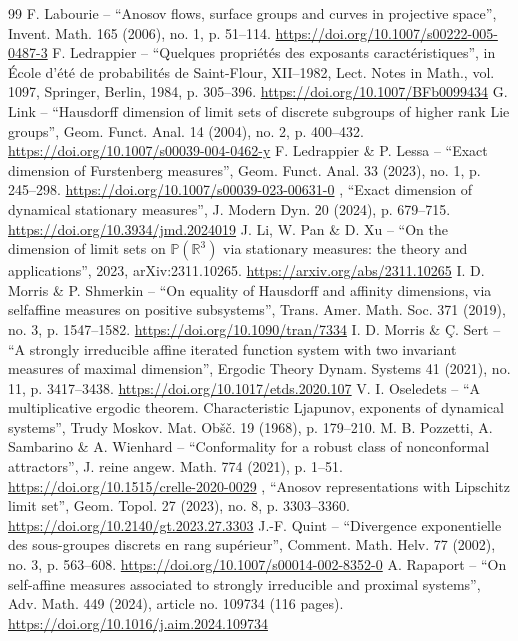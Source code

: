 \begin{thebibliography}{99}
 F. Labourie – “Anosov flows, surface groups and curves in projective space”, Invent. Math. 165 (2006), no. 1, p. 51–114. \url{https://doi.org/10.1007/s00222-005-0487-3}
 F. Ledrappier – “Quelques propriétés des exposants caractéristiques”, in École d’été de probabilités de Saint-Flour, XII–1982, Lect. Notes in Math., vol. 1097, Springer, Berlin, 1984, p. 305–396. \url{https://doi.org/10.1007/BFb0099434}
 G. Link – “Hausdorff dimension of limit sets of discrete subgroups of higher rank Lie groups”, Geom. Funct. Anal. 14 (2004), no. 2, p. 400–432. \url{https://doi.org/10.1007/s00039-004-0462-y}
 F. Ledrappier \& P. Lessa – “Exact dimension of Furstenberg measures”, Geom. Funct. Anal. 33 (2023), no. 1, p. 245–298. \url{https://doi.org/10.1007/s00039-023-00631-0}
 \textemdash{}, “Exact dimension of dynamical stationary measures”, J. Modern Dyn. 20 (2024), p. 679–715. \url{https://doi.org/10.3934/jmd.2024019}
 J. Li, W. Pan \& D. Xu – “On the dimension of limit sets on $\mathbb{P} (\mathbb{R}^3)$ via stationary measures: the theory and applications”, 2023, arXiv:2311.10265. \url{https://arxiv.org/abs/2311.10265}
 I. D. Morris \& P. Shmerkin – “On equality of Hausdorff and affinity dimensions, via selfaffine measures on positive subsystems”, Trans. Amer. Math. Soc. 371 (2019), no. 3, p. 1547–1582. \url{https://doi.org/10.1090/tran/7334}
 I. D. Morris \& Ç. Sert – “A strongly irreducible affine iterated function system with two invariant measures of maximal dimension”, Ergodic Theory Dynam. Systems 41 (2021), no. 11, p. 3417–3438. \url{https://doi.org/10.1017/etds.2020.107}
 V. I. Oseledets – “A multiplicative ergodic theorem. Characteristic Ljapunov, exponents of dynamical systems”, Trudy Moskov. Mat. Obšč. 19 (1968), p. 179–210. 
 M. B. Pozzetti, A. Sambarino \& A. Wienhard – “Conformality for a robust class of nonconformal attractors”, J. reine angew. Math. 774 (2021), p. 1–51. \url{https://doi.org/10.1515/crelle-2020-0029}
 \textemdash{}, “Anosov representations with Lipschitz limit set”, Geom. Topol. 27 (2023), no. 8, p. 3303–3360. \url{https://doi.org/10.2140/gt.2023.27.3303}
 J.-F. Quint – “Divergence exponentielle des sous-groupes discrets en rang supérieur”, Comment. Math. Helv. 77 (2002), no. 3, p. 563–608. \url{https://doi.org/10.1007/s00014-002-8352-0}
 A. Rapaport – “On self-affine measures associated to strongly irreducible and proximal systems”, Adv. Math. 449 (2024), article no. 109734 (116 pages). \url{https://doi.org/10.1016/j.aim.2024.109734}

\end{thebibliography}
